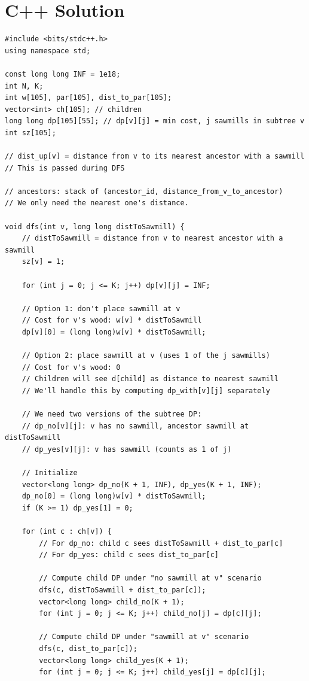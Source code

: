 \documentclass[11pt,a4paper]{article}
\begin{document}
\section{C++ Solution}

\begin{lstlisting}
#include <bits/stdc++.h>
using namespace std;

const long long INF = 1e18;
int N, K;
int w[105], par[105], dist_to_par[105];
vector<int> ch[105]; // children
long long dp[105][55]; // dp[v][j] = min cost, j sawmills in subtree v
int sz[105];

// dist_up[v] = distance from v to its nearest ancestor with a sawmill
// This is passed during DFS

// ancestors: stack of (ancestor_id, distance_from_v_to_ancestor)
// We only need the nearest one's distance.

void dfs(int v, long long distToSawmill) {
    // distToSawmill = distance from v to nearest ancestor with a sawmill
    sz[v] = 1;

    for (int j = 0; j <= K; j++) dp[v][j] = INF;

    // Option 1: don't place sawmill at v
    // Cost for v's wood: w[v] * distToSawmill
    dp[v][0] = (long long)w[v] * distToSawmill;

    // Option 2: place sawmill at v (uses 1 of the j sawmills)
    // Cost for v's wood: 0
    // Children will see d[child] as distance to nearest sawmill
    // We'll handle this by computing dp_with[v][j] separately

    // We need two versions of the subtree DP:
    // dp_no[v][j]: v has no sawmill, ancestor sawmill at distToSawmill
    // dp_yes[v][j]: v has sawmill (counts as 1 of j)

    // Initialize
    vector<long long> dp_no(K + 1, INF), dp_yes(K + 1, INF);
    dp_no[0] = (long long)w[v] * distToSawmill;
    if (K >= 1) dp_yes[1] = 0;

    for (int c : ch[v]) {
        // For dp_no: child c sees distToSawmill + dist_to_par[c]
        // For dp_yes: child c sees dist_to_par[c]

        // Compute child DP under "no sawmill at v" scenario
        dfs(c, distToSawmill + dist_to_par[c]);
        vector<long long> child_no(K + 1);
        for (int j = 0; j <= K; j++) child_no[j] = dp[c][j];

        // Compute child DP under "sawmill at v" scenario
        dfs(c, dist_to_par[c]);
        vector<long long> child_yes(K + 1);
        for (int j = 0; j <= K; j++) child_yes[j] = dp[c][j];


\end{lstlisting}
\end{document}
